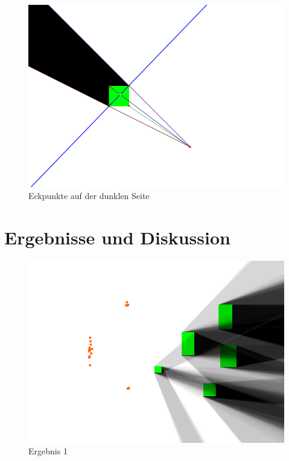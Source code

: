 \documentclass[10pt,twocolumn]{scrartcl}
\begin{document}
\begin{figure}[t]
	\centering
	\includegraphics[width=\columnwidth]{images/durchfuehrung_3.png}
	\caption{Eckpunkte auf der dunklen Seite}
	\label{fig:durch5}
\end{figure}



\section{Ergebnisse und Diskussion}

\begin{figure}[t]
	\centering
	\includegraphics[width=\columnwidth]{images/ergebnis_4.png}
	\caption{Ergebnis 1}
	\label{fig:ergeb1}
\end{figure}
\end{document}
